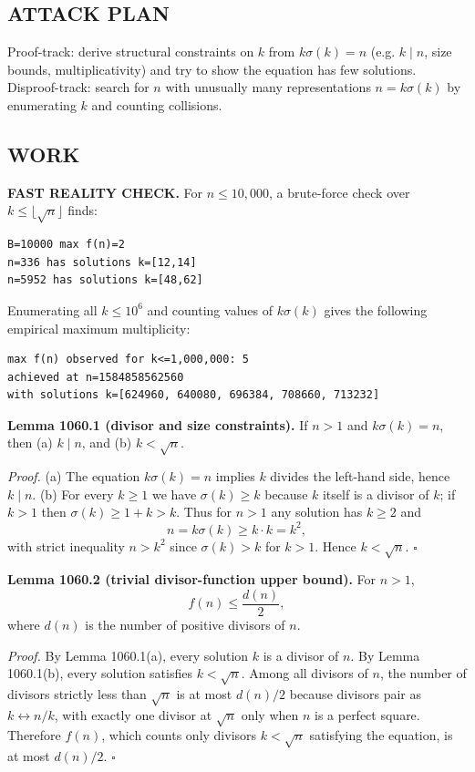 \subsection*{ATTACK PLAN}
Proof-track: derive structural constraints on $k$ from $k\sigma(k)=n$ (e.g. $k\mid n$, size bounds, multiplicativity) and try to show the equation has few solutions.
Disproof-track: search for $n$ with unusually many representations $n=k\sigma(k)$ by enumerating $k$ and counting collisions.

\subsection*{WORK}
\textbf{FAST REALITY CHECK.}
For $n\le 10{,}000$, a brute-force check over $k\le \lfloor\sqrt n\rfloor$ finds:
\begin{verbatim}
B=10000 max f(n)=2
n=336 has solutions k=[12,14]
n=5952 has solutions k=[48,62]
\end{verbatim}
Enumerating all $k\le 10^6$ and counting values of $k\sigma(k)$ gives the following empirical maximum multiplicity:
\begin{verbatim}
max f(n) observed for k<=1,000,000: 5
achieved at n=1584858562560
with solutions k=[624960, 640080, 696384, 708660, 713232]
\end{verbatim}

\medskip
\textbf{Lemma 1060.1 (divisor and size constraints).}
If $n>1$ and $k\sigma(k)=n$, then (a) $k\mid n$, and (b) $k<\sqrt n$.

\emph{Proof.}
(a) The equation $k\sigma(k)=n$ implies $k$ divides the left-hand side, hence $k\mid n$.
(b) For every $k\ge 1$ we have $\sigma(k)\ge k$ because $k$ itself is a divisor of $k$; if $k>1$ then $\sigma(k)\ge 1+k>k$.
Thus for $n>1$ any solution has $k\ge 2$ and
\[
n=k\sigma(k)\ge k\cdot k = k^2,
\]
with strict inequality $n>k^2$ since $\sigma(k)>k$ for $k>1$. Hence $k<\sqrt n$. \hfill$\square$

\medskip
\textbf{Lemma 1060.2 (trivial divisor-function upper bound).}
For $n>1$,
\[
f(n)\le \frac{d(n)}{2},
\]
where $d(n)$ is the number of positive divisors of $n$.

\emph{Proof.}
By Lemma 1060.1(a), every solution $k$ is a divisor of $n$. By Lemma 1060.1(b), every solution satisfies $k<\sqrt n$.
Among all divisors of $n$, the number of divisors strictly less than $\sqrt n$ is at most $d(n)/2$ because divisors pair as $k\leftrightarrow n/k$, with exactly one divisor at $\sqrt n$ only when $n$ is a perfect square.
Therefore $f(n)$, which counts only divisors $k<\sqrt n$ satisfying the equation, is at most $d(n)/2$. \hfill$\square$

